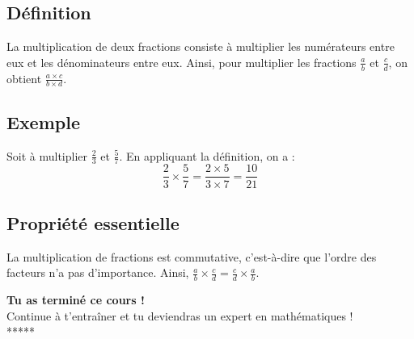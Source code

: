 \documentclass[12pt,a4paper]{article}
\begin{document}
\subsection*{Définition}
La multiplication de deux fractions consiste à multiplier les numérateurs entre eux et les dénominateurs entre eux. Ainsi, pour multiplier les fractions $\frac{a}{b}$ et $\frac{c}{d}$, on obtient $\frac{a \times c}{b \times d}$.

\subsection*{Exemple}
Soit à multiplier $\frac{2}{3}$ et $\frac{5}{7}$. En appliquant la définition, on a :
\[
\frac{2}{3} \times \frac{5}{7} = \frac{2 \times 5}{3 \times 7} = \frac{10}{21}
\]

\subsection*{Propriété essentielle}
La multiplication de fractions est commutative, c'est-à-dire que l'ordre des facteurs n'a pas d'importance. Ainsi, $\frac{a}{b} \times \frac{c}{d} = \frac{c}{d} \times \frac{a}{b}$.

\newpage
\begin{center}
\begin{tcolorbox}[colback=lightgray,colframe=success,title=\textbf{\textcolor{success}{Bravo !}}]
\Large\textbf{\textcolor{success}{Tu as terminé ce cours !}}\\[0.5cm]
\textcolor{secondary}{Continue à t'entraîner et tu deviendras un expert en mathématiques !}\\[0.5cm]
\textcolor{accent}{*****}
\end{tcolorbox}
\end{center}
\end{document}
